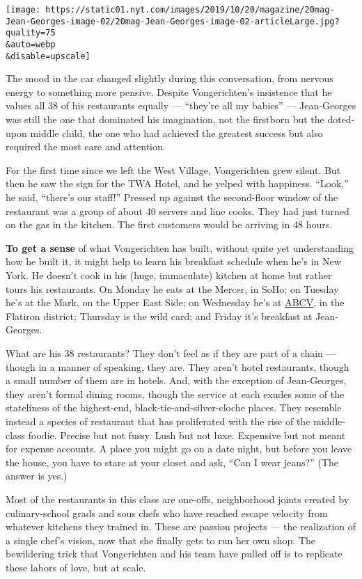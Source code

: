 \texttt{[image: https://static01.nyt.com/images/2019/10/20/magazine/20mag-Jean-Georges-image-02/20mag-Jean-Georges-image-02-articleLarge.jpg?quality=75\\\&auto=webp\\\&disable=upscale]}

The mood in the car changed slightly during this conversation, from
nervous energy to something more pensive. Despite Vongerichten's
insistence that he values all 38 of his restaurants equally ---
``they're all my babies'' --- Jean-Georges was still the one that
dominated his imagination, not the firstborn but the doted-upon middle
child, the one who had achieved the greatest success but also required
the most care and attention.

For the first time since we left the West Village, Vongerichten grew
silent. But then he saw the sign for the TWA Hotel, and he yelped with
happiness. ``Look,'' he said, ``there's our staff!'' Pressed up against
the second-floor window of the restaurant was a group of about 40
servers and line cooks. They had just turned on the gas in the kitchen.
The first customers would be arriving in 48 hours.

\textbf{To get a sense} of what Vongerichten has built, without quite
yet understanding how he built it, it might help to learn his breakfast
schedule when he's in New York. He doesn't cook in his (huge,
immaculate) kitchen at home but rather tours his restaurants. On Monday
he eats at the Mercer, in SoHo; on Tuesday he's at the Mark, on the
Upper East Side; on Wednesday he's at
\href{https://www.nytimes.com/2017/07/03/dining/abcv-review-vegetables-restaurant-jean-georges-vongerichten.html}{ABCV},
in the Flatiron district; Thursday is the wild card; and Friday it's
breakfast at Jean-Georges.

What are his 38 restaurants? They don't feel as if they are part of a
chain --- though in a manner of speaking, they are. They aren't hotel
restaurants, though a small number of them are in hotels. And, with the
exception of Jean-Georges, they aren't formal dining rooms, though the
service at each exudes some of the stateliness of the highest-end,
black-tie-and-silver-cloche places. They resemble instead a species of
restaurant that has proliferated with the rise of the middle-class
foodie. Precise but not fussy. Lush but not luxe. Expensive but not
meant for expense accounts. A place you might go on a date night, but
before you leave the house, you have to stare at your closet and ask,
``Can I wear jeans?'' (The answer is yes.)

Most of the restaurants in this class are one-offs, neighborhood joints
created by culinary-school grads and sous chefs who have reached escape
velocity from whatever kitchens they trained in. These are passion
projects --- the realization of a single chef's vision, now that she
finally gets to run her own shop. The bewildering trick that
Vongerichten and his team have pulled off is to replicate these labors
of love, but at scale.

